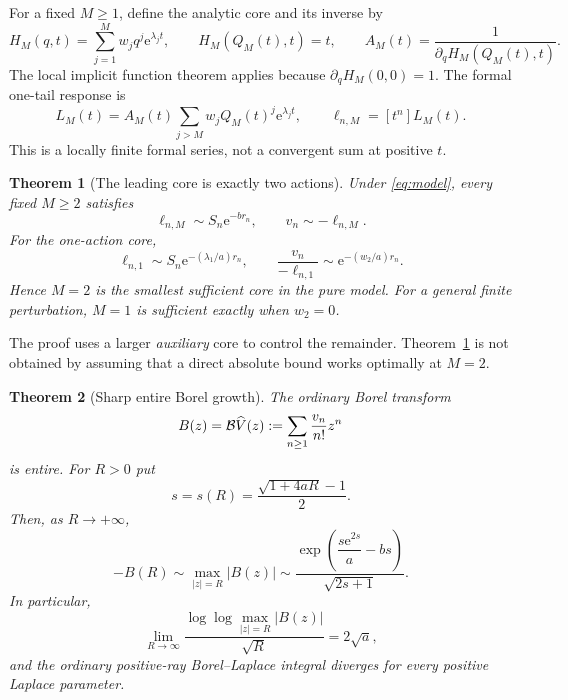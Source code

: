 \documentclass[11pt,a4paper]{article}
\numberwithin{equation}{section}
\newtheorem{theorem}{Theorem}[section]
\theoremstyle{definition}
\theoremstyle{remark}\newtheorem{remark}[theorem]{Remark}
\newcommand{\ee}{\mathrm e}\newcommand{\dd}{\mathrm d}
\newcommand{\B}{\mathcal B}\newcommand{\I}{\mathcal I}
\begin{document}
For a fixed $M\ge1$, define the analytic core and its inverse by
\begin{equation}
 H_M(q,t)=\sum_{j=1}^M w_jq^j\ee^{\lambda_jt},\qquad
 H_M(Q_M(t),t)=t,
 \qquad
 A_M(t)=\frac{1}{\partial_qH_M(Q_M(t),t)}.
 \label{eq:core}
\end{equation}
The local implicit function theorem applies because
$\partial_qH_M(0,0)=1$.
The formal one-tail response is
\begin{equation}
 L_M(t)=A_M(t)\sum_{j>M}w_jQ_M(t)^j\ee^{\lambda_jt},
 \qquad \ell_{n,M}=[t^n]L_M(t).
 \label{eq:L}
\end{equation}
This is a locally finite formal series, not a convergent sum at positive $t$.

\begin{theorem}[The leading core is exactly two actions]
\label{thm:two}
Under \eqref{eq:model}, every fixed $M\ge2$ satisfies
\begin{equation}
 \ell_{n,M}\sim S_n\ee^{-br_n},\qquad
 v_n\sim-\ell_{n,M}.
 \label{eq:two}
\end{equation}
For the one-action core,
\begin{equation}
 \ell_{n,1}\sim S_n\ee^{-(\lambda_1/a)r_n},\qquad
 \frac{v_n}{-\ell_{n,1}}\sim\ee^{-(w_2/a)r_n}.
 \label{eq:one}
\end{equation}
Hence $M=2$ is the smallest sufficient core in the pure model.
For a general finite perturbation, $M=1$ is sufficient exactly when $w_2=0$.
\end{theorem}

The proof uses a larger \emph{auxiliary} core to control the remainder.
Theorem~\ref{thm:two} is not obtained by assuming that a direct absolute bound
works optimally at $M=2$.

\begin{theorem}[Sharp entire Borel growth]
\label{thm:borel}
The ordinary Borel transform
\begin{equation}
 B(z)=\B\V(z):=\sum_{n\ge1}\frac{v_n}{n!}z^n
 \label{eq:Borel}
\end{equation}
is entire. For $R>0$ put
\begin{equation}
 s=s(R)=\frac{\sqrt{1+4aR}-1}{2}.
 \label{eq:sR}
\end{equation}
Then, as $R\to+\infty$,
\begin{equation}
 \boxed{\displaystyle
 -B(R)\sim \max_{|z|=R}|B(z)|
 \sim \frac{\exp\!\left(\dfrac{s\ee^{2s}}a-bs\right)}{\sqrt{2s+1}}.}
 \label{eq:Bmain}
\end{equation}
In particular,
\begin{equation}
 \lim_{R\to\infty}\frac{\log\log\max_{|z|=R}|B(z)|}{\sqrt R}=2\sqrt a,
 \label{eq:Bgrowth}
\end{equation}
and the ordinary positive-ray Borel--Laplace integral diverges for every
positive Laplace parameter.
\end{theorem}
\end{document}
